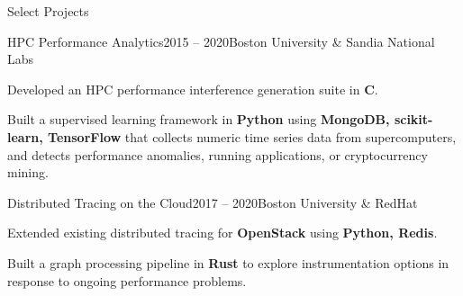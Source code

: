 \documentclass{resume}
\begin{document}
\begin{rSection}{Select Projects}

\begin{rWorksection}{HPC Performance Analytics}{2015 -- 2020}{Boston
    University \& Sandia National Labs}
\item Developed an HPC performance interference generation suite in {\bf C}.
\item Built a supervised learning framework in {\bf Python} using {\bf MongoDB,
    scikit-learn, TensorFlow} that collects numeric time series data from
  supercomputers, and detects performance anomalies, running applications, or
  cryptocurrency mining.
\end{rWorksection}

\begin{rWorksection}{Distributed Tracing on the Cloud}{2017 -- 2020}{Boston
    University \& RedHat}
\item Extended existing distributed tracing for {\bf OpenStack} using {\bf
    Python, Redis}.
\item Built a graph processing pipeline in {\bf Rust} to explore
  instrumentation options in response to ongoing performance problems.
\end{rWorksection}

\end{rSection}

\pagebreak

\end{document}
